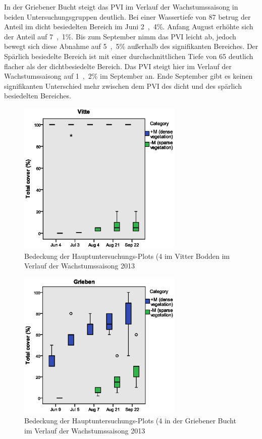 In der Griebener Bucht steigt das PVI im Verlauf der Wachstumssaisong in beiden Untersuchungsgruppen deutlich. Bei einer Wassertiefe von \unit{87}{\centi\metre} betrug der Anteil im dicht besiedelten Bereich im Juni \unit{2,4}{\%}. Anfang August erhöhte sich der Anteil auf \unit{7,1}{\%}. Bis zum September nimm das PVI leicht ab, jedoch bewegt sich diese Abnahme auf \unit{5,5}{\%} außerhalb des signifikanten Bereiches.
Der Spärlich besiedelte Bereich ist mit einer durchschnittlichen Tiefe von \unit{65}{\centi\metre} deutlich flacher als der dichtbesiedelte Bereich. Das PVI steigt hier im Verlauf der Wachstumssaisong auf \unit{1,2}{\%} im September an. Ende September gibt es keinen signifikanten Unterschied mehr zwischen dem PVI des dicht und des spärlich besiedelten Bereiches.


\begin{figure}[!htb]
\centering
\includegraphics[width=0.70\textwidth]{images/total_cover/Boxplots_G_V1.eps}
\caption[Bedeckung mit Makrophyten, Vitte]{Bedeckung der Hauptuntersuchungs-Plots (\unit{4}{\metre\squared} im Vitter Bodden im Verlauf der Wachstumssaisong 2013}
\label{fig:cover_vitte}
\end{figure}

\begin{figure}[!htb]
\centering
\includegraphics[width=0.70\textwidth]{images/total_cover/Boxplots_G_V2.eps}
\caption[Bedeckung mit Makrophyten, Grieben]{Bedeckung der Hauptuntersuchungs-Plots (\unit{4}{\metre\squared} in der Griebener Bucht im Verlauf der Wachstumssaisong 2013}
\label{fig:cover_grieben}
\end{figure}



